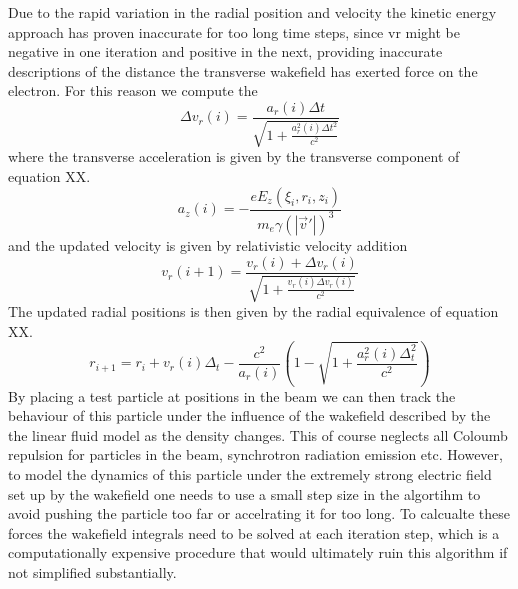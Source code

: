 Due to the rapid variation in the radial position and velocity the kinetic energy approach has proven inaccurate for too long time steps, since vr might be negative in one iteration and positive in the next, providing inaccurate descriptions of the distance the transverse wakefield has exerted force on the electron.  For this reason we compute the  
\begin{equation}
\Delta v_r(i)=\frac{a_r(i) \Delta t}{\sqrt{1+\frac{a_r^2(i) \Delta t^2}{c^2}}}
\end{equation}
where the transverse acceleration is given by the transverse component of equation XX.
 \begin{equation}
 a_z(i)=-\frac{eE_z\left(\xi_i,r_i,z_i\right)}{m_e\gamma(|\vec{v}'|)^3}
 \end{equation}
and the updated velocity is given by relativistic velocity addition
\begin{equation}
v_r(i+1)=\frac{v_r(i)+\Delta v_r(i)}{\sqrt{1+\frac{v_r(i)\Delta v_r(i)}{c^2}}}
\end{equation}
The updated radial positions is then given by the radial equivalence of equation XX. 
\begin{equation}
\label{RUpdate}
r_{i+1}=r_i+v_r(i)\Delta_t -\frac{c^2}{a_r(i)} \left(1-\sqrt{1+\frac{a_r^2(i) \Delta_t^2}{c^2}}\right)
\end{equation}
By placing a test particle at positions in the beam we can then track the behaviour of this particle under the influence of the wakefield described by the the linear fluid model as the density changes. This of course neglects all Coloumb repulsion for particles in the beam, synchrotron radiation emission etc. 
However, to model the dynamics of this particle under the extremely strong electric field set up by the wakefield one needs to use a small step size in the algortihm to avoid pushing the particle too far or accelrating it for too long. To calcualte these forces the wakefield integrals need to be solved at each iteration step, which is a computationally expensive procedure that would ultimately ruin this algorithm if not simplified substantially.
